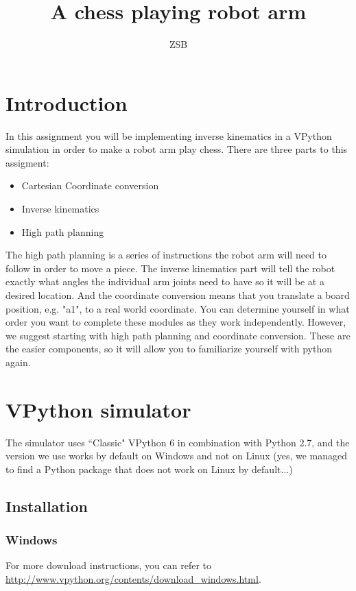 \documentclass{article}
\title{A chess playing robot arm}
\author{ZSB}
\date{}
\begin{document}
\maketitle

\section*{Introduction}

In this assignment you will be implementing inverse kinematics in a VPython simulation in order to make a robot arm play chess. There are three parts to this assigment:
\begin{itemize}
    \item Cartesian Coordinate conversion
    \item Inverse kinematics
    \item High path planning    
\end{itemize}
The high path planning is a series of instructions the robot arm will need to follow in order to move a piece. The inverse kinematics part will tell the robot exactly what angles the individual arm joints need to have so it will be at a desired location. And the coordinate conversion means that you translate a board position, e.g. "a1", to a real world coordinate. You can determine yourself in what order you want to complete these modules as they work independently. However, we suggest starting with high path planning and coordinate conversion. These are the easier components, so it will allow you to familiarize yourself with python again.

\section*{VPython simulator}
The simulator uses ``Classic" VPython 6 in combination with Python 2.7, and the version we use works by default on Windows and not on Linux (yes, we managed to find a Python package that does not work on Linux by default...)

\subsection*{Installation}
\subsubsection*{Windows}
For more download instructions, you can refer to \url{http://www.vpython.org/contents/download_windows.html}.
\end{document}
